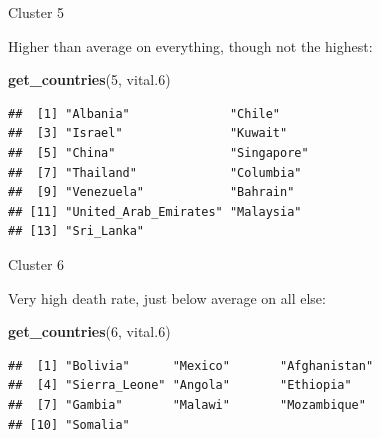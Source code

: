 \documentclass[
  ignorenonframetext,
]{beamer}
\newenvironment{Shaded}{\begin{snugshade}}{\end{snugshade}}
\newcommand{\DecValTok}[1]{\textcolor[rgb]{0.00,0.00,0.81}{#1}}
\newcommand{\FloatTok}[1]{\textcolor[rgb]{0.00,0.00,0.81}{#1}}
\newcommand{\KeywordTok}[1]{\textcolor[rgb]{0.13,0.29,0.53}{\textbf{#1}}}
\newcommand{\NormalTok}[1]{#1}
\begin{document}
\begin{frame}[fragile]{Cluster 5}
\protect\hypertarget{cluster-5}{}

Higher than average on everything, though not the highest:

\begin{Shaded}
\begin{Highlighting}[]
\KeywordTok{get_countries}\NormalTok{(}\DecValTok{5}\NormalTok{, vital}\FloatTok{.6}\NormalTok{)}
\end{Highlighting}
\end{Shaded}

\begin{verbatim}
##  [1] "Albania"              "Chile"               
##  [3] "Israel"               "Kuwait"              
##  [5] "China"                "Singapore"           
##  [7] "Thailand"             "Columbia"            
##  [9] "Venezuela"            "Bahrain"             
## [11] "United_Arab_Emirates" "Malaysia"            
## [13] "Sri_Lanka"
\end{verbatim}

\end{frame}

\begin{frame}[fragile]{Cluster 6}
\protect\hypertarget{cluster-6}{}

Very high death rate, just below average on all else:

\begin{Shaded}
\begin{Highlighting}[]
\KeywordTok{get_countries}\NormalTok{(}\DecValTok{6}\NormalTok{, vital}\FloatTok{.6}\NormalTok{)}
\end{Highlighting}
\end{Shaded}

\begin{verbatim}
##  [1] "Bolivia"      "Mexico"       "Afghanistan" 
##  [4] "Sierra_Leone" "Angola"       "Ethiopia"    
##  [7] "Gambia"       "Malawi"       "Mozambique"  
## [10] "Somalia"
\end{verbatim}

\end{frame}
\end{document}
